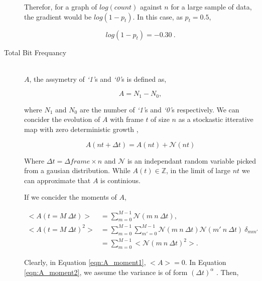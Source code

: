 \begin{description}
					Therefor, for a graph of $log(count)$ against $n$ for a large sample of data, the gradient would be $log(1 - p_t)$.
					In this case, as $p_t = 0.5$, 

					\begin{equation}
						log(1 - p_t) = -0.30\ .
						\label{eqn:log_chain_length_gradient}			
					\end{equation}

				\item[Total Bit Frequancy] \hfill \\
					
					$A$, the assymetry of \textit{`1'}s and \textit{`0'}s is defined as,

					\begin{equation}
						A = N_1 - N_0,
						\label{eqn:a_def}
					\end{equation}

					where $N_1$ and $N_0$ are the number of \textit{`1'}s and \textit{`0'}s respectively.
					We can concider the evolution of $A$ with frame $t$ of size $n$ as a stockastic itterative map with zero deterministic growth \supercite{ref:stockastic_physics},

					\begin{equation}
						A(nt + \Delta t) = A(nt) + \mathcal{N}(nt)
					\end{equation}

					Where $\Delta t = \Delta frame \times n$ and $\mathcal{N}$ is an independant random variable picked from a gausian distribution. While $A(t) \in \mathbb{Z}$, in the limit of large $nt$ we can approximate that $A$ is continious. 
					\par
					If we concider the moments of $A$,

					\begin{align}
						\label{eqn:A_moment1}
						<A(t = M\ \Delta t)> & = \sum_{m = 0}^{M -1}  \mathcal{N}(m\ n\ \Delta t), \\
						\label{eqn:A_moment2}
						<A(t = M\ \Delta t)^2> & = \sum_{m=0}^{M-1} \sum_{m'=0}^{M-1}  \mathcal{N}(m\ n\ \Delta t) \mathcal{N}(m'\ n\ \Delta t)\ \delta_{mm'} \nonumber \\
						&= \sum_{m=0}^{M-1} < \mathcal{N}(m\ n\ \Delta t)^2 >.
					\end{align}

					Clearly, in Equation \ref{eqn:A_moment1}, $<A> = 0$. In Equation \ref{eqn:A_moment2}, we assume the variance is of form $(\Delta t)^\alpha$ \cite{ref:stockastic_physics}. Then,


\end{description}

